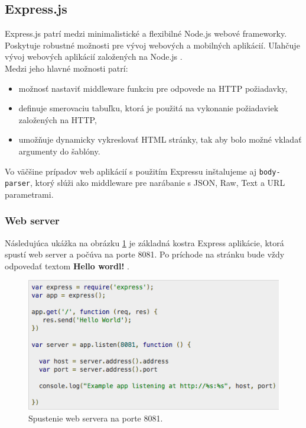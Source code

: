 \subsection{Express.js}
Express.js patrí medzi minimalistické a flexibilné Node.js webové frameworky. Poskytuje robustné možnosti pre vývoj webových a mobilných aplikácií. Uľahčuje vývoj webových aplikácií založených na Node.js \cite{express-tutorial}.\\

\noindent Medzi jeho hlavné možnosti patrí:
\begin{itemize}
\item možnosť nastaviť middleware funkciu pre odpovede na HTTP požiadavky,
\item definuje smerovaciu tabuľku, ktorá je použitá na vykonanie požiadaviek založených na HTTP,
\item umožňuje dynamicky vykreslovať HTML stránky, tak aby bolo možné vkladať argumenty do šablóny.
\end{itemize}

Vo väčšine prípadov web aplikácií s použitím Expressu inštalujeme aj \verb|body-parser|, ktorý slúži ako middleware pre narábanie s JSON, Raw, Text a URL parametrami.

\subsubsection{Web server}
Následujúca ukážka na obrázku \ref{img-express-base} je základná kostra Express aplikácie, ktorá spustí web server a počúva na porte 8081. Po príchode na stránku bude vždy odpovedať textom \textbf{Hello wordl!} \cite{express-tutorial}.

\begin{figure}[H]
  \centering
  \includegraphics[scale=0.7]{img/express/express-example.png}
  \caption{Spustenie web servera na porte 8081.}
  \label{img-express-base}
\end{figure}

